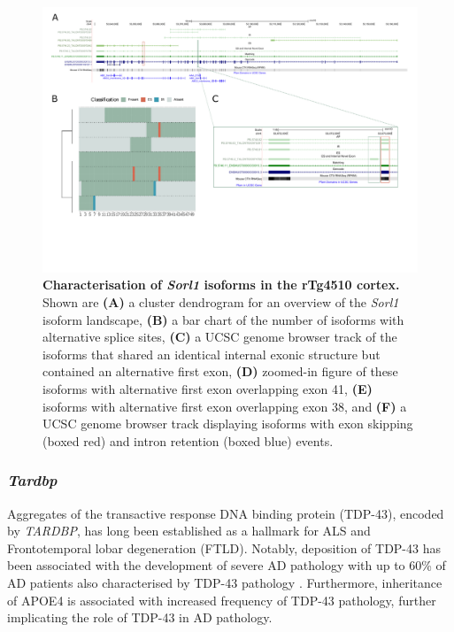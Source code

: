\begin{landscape}
	\begin{figure}[htp]
		\centering
		\captionsetup{width=1.3\textwidth}
		\includegraphics[page=10,trim={0 0.5cm 0 0},scale = 0.8]{Figures/TargetGenes_Annotation_Landscape.pdf}
		\caption[Characterisation of the \textit{Sorl1} isoform landscape]%
		{\textbf{Characterisation of \textit{Sorl1} isoforms in the rTg4510 cortex.} Shown are \textbf{(A)} a cluster dendrogram for an overview of the \textit{Sorl1} isoform landscape, \textbf{(B)} a bar chart of the number of isoforms with alternative splice sites, \textbf{(C)} a UCSC genome browser track of the isoforms that shared an identical internal exonic structure but contained an alternative first exon, \textbf{(D)} zoomed-in figure of these isoforms with alternative first exon overlapping exon 41, \textbf{(E)} isoforms with alternative first exon overlapping exon 38, and \textbf{(F)} a UCSC genome browser track displaying isoforms with exon skipping (boxed red) and intron retention (boxed blue) events.}    
		\label{fig:sorl1}
	\end{figure}
\end{landscape}
\restoregeometry

\newpage
\subsubsection{\textit{Tardbp}}
Aggregates of the transactive response DNA binding protein (TDP-43), encoded by \textit{TARDBP}, has long been established as a hallmark for ALS and Frontotemporal lobar degeneration (FTLD)\cite{Meneses2021}. Notably, deposition of TDP-43 has been associated with the development of severe AD pathology with up to 60\% of AD patients also characterised by TDP-43 pathology \cite{Brouwers2010}. Furthermore, inheritance of APOE4 is associated with increased frequency of TDP-43 pathology, further implicating the role of TDP-43 in AD pathology\cite{Meneses2021}. 

